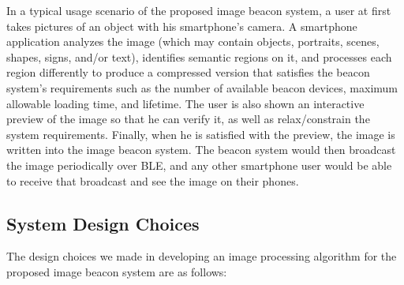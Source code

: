 In a typical usage scenario of the proposed image beacon system, a user at first takes pictures of an object with his smartphone's camera. A smartphone application analyzes the image (which may contain objects, portraits, scenes, shapes, signs, and/or text), identifies semantic regions on it, and processes each region differently to produce a compressed version that satisfies the beacon system's requirements such as the number of available beacon devices, maximum allowable loading time, and lifetime. The user is also shown an interactive preview of the image so that he can verify it, as well as relax/constrain the system requirements. Finally, when he is satisfied with the preview, the image is written into the image beacon system. The beacon system would then broadcast the image periodically over BLE, and any other smartphone user would be able to receive that broadcast and see the image on their phones.


\subsection{System Design Choices}

The design choices we made in developing an image processing algorithm for the proposed image beacon system are as follows:

